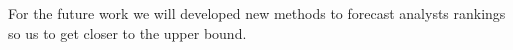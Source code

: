 \documentclass{article}\usepackage[]{graphicx}\usepackage[]{color}
\newcommand{\tr}{\textit{true}}
\newcommand{\naive}{\textit{recent}}
\newcommand{\default}{\textit{all-time}}
\begin{document}

For the future work we will developed new methods to forecast analysts rankings so us to get closer to the upper bound.



%



\end{document}
